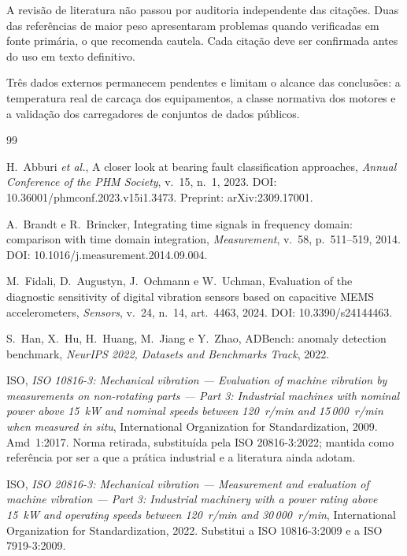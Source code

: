 \documentclass[11pt,a4paper]{article}
\begin{document}
A revisão de literatura não passou por auditoria independente das citações. Duas das
referências de maior peso apresentaram problemas quando verificadas em fonte primária, o
que recomenda cautela. Cada citação deve ser confirmada antes do uso em texto definitivo.

Três dados externos permanecem pendentes e limitam o alcance das conclusões: a temperatura
real de carcaça dos equipamentos, a classe normativa dos motores e a validação dos
carregadores de conjuntos de dados públicos.


\small
\begin{thebibliography}{99}
\setlength{\itemsep}{2pt}

H.~Abburi \emph{et al.},
\newblock A closer look at bearing fault classification approaches,
\newblock \emph{Annual Conference of the PHM Society}, v.~15, n.~1, 2023.
\newblock DOI: 10.36001/phmconf.2023.v15i1.3473. Preprint: arXiv:2309.17001.

A.~Brandt e R.~Brincker,
\newblock Integrating time signals in frequency domain: comparison with time domain integration,
\newblock \emph{Measurement}, v.~58, p.~511--519, 2014.
\newblock DOI: 10.1016/j.measurement.2014.09.004.

M.~Fidali, D.~Augustyn, J.~Ochmann e W.~Uchman,
\newblock Evaluation of the diagnostic sensitivity of digital vibration sensors based on capacitive MEMS accelerometers,
\newblock \emph{Sensors}, v.~24, n.~14, art.~4463, 2024.
\newblock DOI: 10.3390/s24144463.

S.~Han, X.~Hu, H.~Huang, M.~Jiang e Y.~Zhao,
\newblock ADBench: anomaly detection benchmark,
\newblock \emph{NeurIPS 2022, Datasets and Benchmarks Track}, 2022.

ISO,
\newblock \emph{ISO 10816-3: Mechanical vibration --- Evaluation of machine vibration by measurements on non-rotating parts --- Part 3: Industrial machines with nominal power above 15~kW and nominal speeds between 120~r/min and 15\,000~r/min when measured in situ},
\newblock International Organization for Standardization, 2009. Amd~1:2017.
\newblock Norma retirada, substituída pela ISO 20816-3:2022; mantida como referência por ser a que a prática industrial e a literatura ainda adotam.

ISO,
\newblock \emph{ISO 20816-3: Mechanical vibration --- Measurement and evaluation of machine vibration --- Part 3: Industrial machinery with a power rating above 15~kW and operating speeds between 120~r/min and 30\,000~r/min},
\newblock International Organization for Standardization, 2022.
\newblock Substitui a ISO 10816-3:2009 e a ISO 7919-3:2009.


\end{thebibliography}
\end{document}
